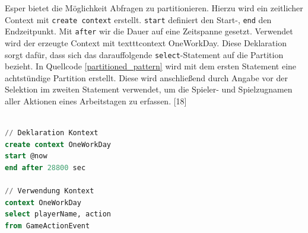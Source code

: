 Esper bietet die Möglichkeit Abfragen zu partitionieren.
Hierzu wird ein zeitlicher Context mit \texttt{create context} erstellt.
\texttt{start} definiert den Start-, \texttt{end} den Endzeitpunkt.
Mit \texttt{after} wir die Dauer auf eine Zeitspanne gesetzt. Verwendet wird der erzeugte Context mit texttt{context OneWorkDay}. Diese Deklaration sorgt dafür, dass sich das darauffolgende \texttt{select}-Statement auf die Partition bezieht.
In Quellcode \ref{partitioned_pattern} wird mit dem ersten Statement eine achtstündige Partition erstellt. Diese wird anschließend durch Angabe vor der Selektion im zweiten Statement verwendet, um die Spieler- und Spielzugnamen aller Aktionen eines Arbeitstagen zu erfassen.
\cite{EsperRef2018}[18]

\begin{lstlisting}[caption={Partitioniertes Pattern},label=partitioned_pattern,captionpos=b,language=SQL]

// Deklaration Kontext
create context OneWorkDay
start @now 
end after 28800 sec

// Verwendung Kontext
context OneWorkDay 
select playerName, action 
from GameActionEvent

\end{lstlisting}
